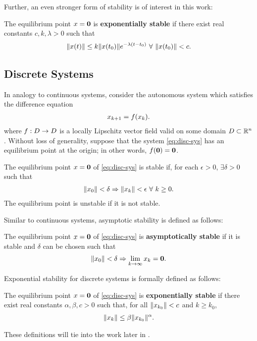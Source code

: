 Further, an even stronger form of stability is of interest in this work:
%
\begin{definition}
  The equilibrium point $x = {\mathbf 0}$ is {\bf exponentially stable} if there
  exist real constants $c, k, \lambda > 0$ such that
  \begin{align*}
    \nxt \leq k \nxtnaught e^{-\lambda (t - t_{0})} \ \forall \ \nxtnaught < c.
  \end{align*}
\end{definition}


\subsection{Discrete Systems}

In analogy to continuous systems, consider the autonomous system which satisfies
the difference equation
\begin{align}
  \label{eq:disc-sys}
  x_{k+1} = f(x_{k}).
\end{align}
where $f : D \to D$ is a locally Lipschitz vector field valid on some domain
$D \subset \mathbb{R}^{n}$.
%
Without loss of generality, suppose that the system \eqref{eq:disc-sys} has an
equilibrium point at the origin;
%
in other words, $f({\mathbf 0}) = {\mathbf 0}$.
%
\begin{definition}
  The equilibrium point $x = {\mathbf 0}$ of \eqref{eq:disc-sys} is stable if,
  for each $\epsilon > 0$, $\exists \delta > 0$ such that
  \begin{align*}
    \|x_{0}\| < \delta \Rightarrow \|x_{k}\| < \epsilon \ \forall \ k
    \geq 0.
  \end{align*}
  The equilibrium point is unstable if it is not stable.
\end{definition}
%
Similar to continuous systems, asymptotic stability is defined as follows:
%
\begin{definition}
  The equilibrium point $x = {\mathbf 0}$ of \eqref{eq:disc-sys} is {\bf
    asymptotically stable} if it is stable and $\delta$ can be chosen such that
  \begin{align*}
    \|x_{0}\| < \delta \Rightarrow \lim_{k \to \infty} x_{k} = {\mathbf 0}.
  \end{align*}
\end{definition}
%
Exponential stability for discrete systems is formally defined as follows:
%
\begin{definition}
  The equilibrium point $x = {\mathbf 0}$ of \eqref{eq:disc-sys} is {\bf
    exponentially stable} if there exist real constants $\alpha, \beta, c> 0$
  such that, for all $\|x_{k_{0}}\| < c$ and $k \geq k_{0}$,
  \begin{align*}
    \|x_{k}\| \leq \beta \|x_{k_{0}}\|^{\alpha}.
  \end{align*}
\end{definition}
%
These definitions will tie into the work later in .


